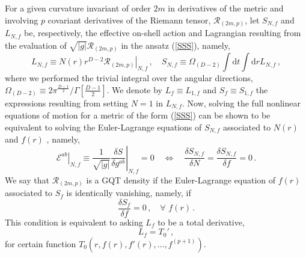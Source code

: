 \documentclass[11pt]{article}
\newcommand{\req}[1]{(\ref{#1})} %
\newcommand{\diff}{\mathrm{d}}
\newcommand{\be}{\begin{equation}}
\newcommand{\ee}{\end{equation} }
\renewcommand{\req}[1]{eq.~(\ref{#1})}
\begin{document}
{For a given curvature invariant of order $2m$ in derivatives of the metric and involving $p$ covariant derivatives of the Riemann tensor, $\mathcal{R}_{(2m,p)}$, let  $S_{N,f}$ and $L_{N,f} $ be, respectively, the  effective on-shell action and Lagrangian resulting from the evaluation of  $\sqrt{|g|}\mathcal{R}_{(2m,p)}$ in the ansatz (\ref{SSS}), namely,
\begin{equation}\label{ansS}
L_{N,f}\equiv \left. N(r)   r^{D-2}   \mathcal{R}_{(2m,p)}\right|_{N,f}\, ,   \quad  S_{N,f}\equiv   \Omega_{(D-2)}\int \diff t  \int  \diff r L_{N,f} \, ,
\end{equation}
where we performed the trivial integral over the angular directions,   $\Omega_{(D-2)}\equiv   2\pi^{\frac{D-1}{2}}/\Gamma[\frac{D-1}{2}]$. We denote by $L_f\equiv L_{1,f}$ and $S_f\equiv S_{1,f}$ the expressions resulting from setting $N=1$  in $L_{N,f}$. 
Now, solving the full nonlinear equations of motion for a metric of the form (\ref{SSS}) can be shown to be equivalent to solving  the Euler-Lagrange equations of $S_{N,f}$ associated to $N(r)$ and $f(r)$ \cite{Palais:1979rca,Fels:2001rv,Deser:2003up,PabloPablo4}, namely,
\be
\left.\mathcal{E}^{ab}\right|_{N,f}\equiv \left. \frac{1}{\sqrt{|g|}}  \frac{\delta S}{\delta g^{ab}}  \right|_{N,f}=0 \quad   \Leftrightarrow   \quad \frac{\delta S_{N,f}}{\delta N}= \frac{\delta S_{N,f}}{\delta f}=0\, .
\ee
We say that  $\mathcal{R}_{(2m,p)}$ is a GQT density if the Euler-Lagrange equation of $f(r)$ associated to  $S_f$ is identically   vanishing, namely,  if
\begin{equation} \label{GQTGcond}
\frac{\delta S_{f}}{\delta f}=0\, ,   \quad \forall \, \, f(r)\, .
\end{equation}
This condition is equivalent to  asking $L_f$ to be  a total derivative,  
\begin{equation}\label{condd2}
L_f =T_0'\, ,
\end{equation}
for certain function  $T_0(r,f(r),f'(r),\dots , f^{(p+1)})$.


}
\end{document}
